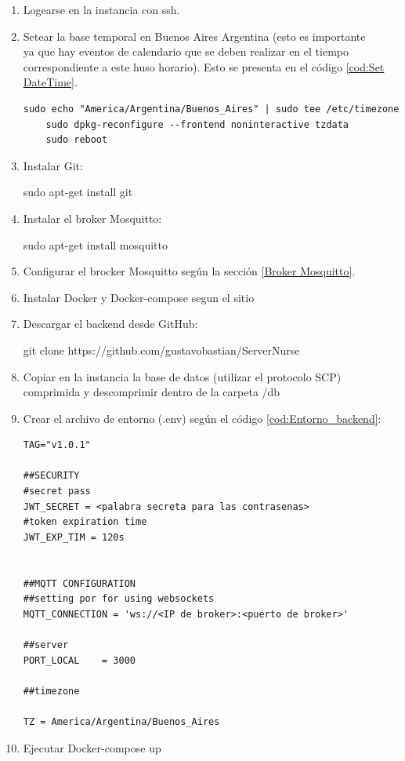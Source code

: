 \begin{enumerate}


\item Logearse en la instancia con ssh.
\item Setear la base temporal en Buenos Aires Argentina (esto es importante \\ ya que hay eventos de calendario que se deben realizar en el tiempo correspondiente a este huso horario). Esto se presenta en el código \ref{cod:Set DateTime}.\\

\begin{lstlisting}[label=cod:Set DateTime,caption=  Configuración de zona horaria.]
	sudo echo "America/Argentina/Buenos_Aires" | sudo tee /etc/timezone
	sudo dpkg-reconfigure --frontend noninteractive tzdata
	sudo reboot
\end{lstlisting}

\item Instalar Git:

	sudo apt-get install git
\item Instalar el broker Mosquitto:
	
	sudo apt-get install mosquitto
\item Configurar el brocker Mosquitto según la sección \ref{Broker Mosquitto}.
\item Instalar Docker y Docker-compose segun el sitio \citep{WEBSITE:8}
\item Descargar el backend desde GitHub:

	git clone  https://github.com/gustavobastian/ServerNurse
\item Copiar en la instancia la base de datos (utilizar el protocolo SCP) comprimida y descomprimir dentro de la carpeta /db
\pagebreak
\item Crear el archivo de entorno (.env) según el código \ref{cod:Entorno_backend}:


\begin{lstlisting}[label=cod:Entorno_backend,caption=  Entorno del backend.]
TAG="v1.0.1"

##SECURITY
#secret pass
JWT_SECRET = <palabra secreta para las contrasenas>
#token expiration time
JWT_EXP_TIM = 120s


##MQTT CONFIGURATION
##setting por for using websockets
MQTT_CONNECTION = 'ws://<IP de broker>:<puerto de broker>'

##server
PORT_LOCAL    = 3000

##timezone

TZ = America/Argentina/Buenos_Aires 
\end{lstlisting}


\item Ejecutar Docker-compose up
\end{enumerate}

